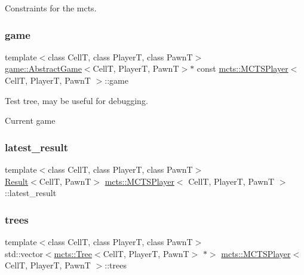 Constraints for the mcts. 

\mbox{\label{classmcts_1_1_m_c_t_s_player_ae4ff52c6d9e13dc5801b53bb11e32a64}} 
\subsubsection{\texorpdfstring{game}{game}}
{\footnotesize\ttfamily template$<$class CellT, class PlayerT, class PawnT$>$ \\
\hyperlink{classgame_1_1_abstract_game}{game\+::\+Abstract\+Game}$<$CellT, PlayerT, PawnT$>$$\ast$ const \hyperlink{classmcts_1_1_m_c_t_s_player}{mcts\+::\+M\+C\+T\+S\+Player}$<$ CellT, PlayerT, PawnT $>$\+::game\hspace{0.3cm}{\ttfamily [protected]}}



Test tree, may be useful for debugging. 

Current game \mbox{\label{classmcts_1_1_m_c_t_s_player_ac9924c9244797868d40ffa64d715aa18}} 
\subsubsection{\texorpdfstring{latest\+\_\+result}{latest\_result}}
{\footnotesize\ttfamily template$<$class CellT, class PlayerT, class PawnT$>$ \\
\hyperlink{structmcts_1_1_result}{Result}$<$CellT, PawnT$>$ \hyperlink{classmcts_1_1_m_c_t_s_player}{mcts\+::\+M\+C\+T\+S\+Player}$<$ CellT, PlayerT, PawnT $>$\+::latest\+\_\+result\hspace{0.3cm}{\ttfamily [protected]}}

\mbox{\label{classmcts_1_1_m_c_t_s_player_a4b0bb8828ed63c2f24fa4cf2cab14e7d}} 
\subsubsection{\texorpdfstring{trees}{trees}}
{\footnotesize\ttfamily template$<$class CellT, class PlayerT, class PawnT$>$ \\
std\+::vector$<$\hyperlink{classmcts_1_1_tree}{mcts\+::\+Tree}$<$CellT, PlayerT, PawnT$>$ $\ast$$>$ \hyperlink{classmcts_1_1_m_c_t_s_player}{mcts\+::\+M\+C\+T\+S\+Player}$<$ CellT, PlayerT, PawnT $>$\+::trees\hspace{0.3cm}{\ttfamily [protected]}}



